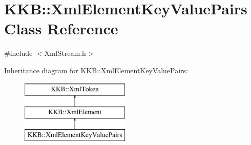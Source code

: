 \hypertarget{class_k_k_b_1_1_xml_element_key_value_pairs}{}\section{K\+KB\+:\+:Xml\+Element\+Key\+Value\+Pairs Class Reference}
\label{class_k_k_b_1_1_xml_element_key_value_pairs}


{\ttfamily \#include $<$Xml\+Stream.\+h$>$}

Inheritance diagram for K\+KB\+:\+:Xml\+Element\+Key\+Value\+Pairs\+:\begin{figure}[H]
\begin{center}
\leavevmode
\includegraphics[height=3.000000cm]{class_k_k_b_1_1_xml_element_key_value_pairs}
\end{center}
\end{figure}
